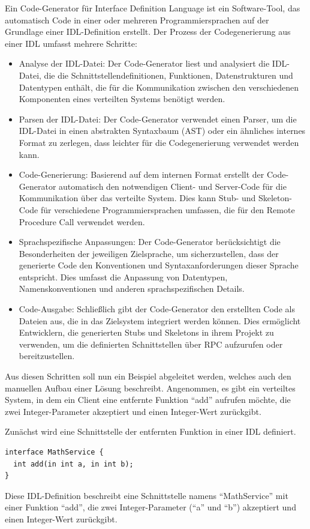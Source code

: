 Ein Code-Generator für Interface Definition Language ist ein Software-Tool, das automatisch Code in einer oder mehreren Programmiersprachen auf der Grundlage einer IDL-Definition erstellt. Der Prozess der Codegenerierung aus einer IDL umfasst mehrere Schritte:
\begin{itemize} 
\item Analyse der IDL-Datei: Der Code-Generator liest und analysiert die IDL-Datei, die die Schnittstellendefinitionen, Funktionen, Datenstrukturen und Datentypen enthält, die für die Kommunikation zwischen den verschiedenen Komponenten eines verteilten Systems benötigt werden.
\item Parsen der IDL-Datei: Der Code-Generator verwendet einen Parser, um die IDL-Datei in einen abstrakten Syntaxbaum (AST) oder ein ähnliches internes Format zu zerlegen, dass leichter für die Codegenerierung verwendet werden kann.
\item Code-Generierung: Basierend auf dem internen Format erstellt der Code-Generator automatisch den notwendigen Client- und Server-Code für die Kommunikation über das verteilte System. Dies kann Stub- und Skeleton-Code für verschiedene Programmiersprachen umfassen, die für den Remote Procedure Call verwendet werden.
\item Sprachspezifische Anpassungen: Der Code-Generator berücksichtigt die Besonderheiten der jeweiligen Zielsprache, um sicherzustellen, dass der generierte Code den Konventionen und Syntaxanforderungen dieser Sprache entspricht. Dies umfasst die Anpassung von Datentypen, Namenskonventionen und anderen sprachspezifischen Details.
\item Code-Ausgabe: Schließlich gibt der Code-Generator den erstellten Code als Dateien aus, die in das Zielsystem integriert werden können. Dies ermöglicht Entwicklern, die generierten Stubs und Skeletons in ihrem Projekt zu verwenden, um die definierten Schnittstellen über RPC aufzurufen oder bereitzustellen.
\end{itemize} 

Aus diesen Schritten soll nun ein Beispiel abgeleitet werden, welches auch den manuellen Aufbau einer Lösung beschreibt. Angenommen, es gibt ein verteiltes System, in dem ein Client eine entfernte Funktion \enquote{add} aufrufen möchte, die zwei Integer-Parameter akzeptiert und einen Integer-Wert zurückgibt.

Zunächst wird eine Schnittstelle der entfernten Funktion in einer IDL definiert. \\
\noindent\begin{minipage}{\textwidth}
\begin{lstlisting}[caption={IDL Example},captionpos=b,label={lst:idl-example}]
interface MathService {
  int add(in int a, in int b);
}
\end{lstlisting}
\end{minipage}
Diese IDL-Definition beschreibt eine Schnittstelle namens \enquote{MathService} mit einer Funktion \enquote{add}, die zwei Integer-Parameter (\enquote{a} und \enquote{b}) akzeptiert und einen Integer-Wert zurückgibt.

